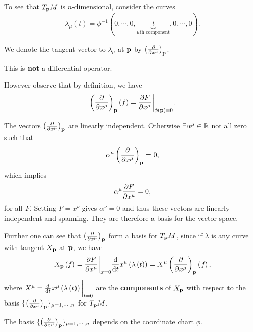 To see that $T_{\vb{p}}M$ is $n$-dimensional, consider the curves
\begin{align}
    \lambda_{\mu} \left( t \right) = \phi ^{-1} \left( 0, \cdots, 0, \underbrace{t}_{\mu\text{th component}},0,\cdots, 0 \right) 
.\end{align}

We denote the tangent vector to $\lambda_\mu$ at $\vb{p}$ by $\left( \pdv{x^{\mu}} \right)_{\vb{p}} $. 

\begin{note}
    This is \textbf{not} a differential operator.
\end{note}

However observe that by definition, we have
\begin{align}
    \left( \pdv{x^{\mu}} \right)_{\vb{p}}\left( f \right) = \pdv{F}{x^{\mu}} \bigg|_{\phi \left( \vb{p} \right) = 0}
.\end{align}

The vectors $\left( \pdv{x^{\mu}} \right)_{\vb{p}}$ are linearly independent. Otherwise $\exists  \alpha^{\mu} \in \mathbb{R}$ not all zero such that
\begin{align}
    \alpha^{\mu} \left( \pdv{x^{\mu}} \right)_{\vb{p}}  = 0
,\end{align}
which implies
\begin{align}
    \alpha^{\mu} \pdv{F}{x^{\mu}} = 0
,\end{align}
for all $F$. Setting $F = x^{\nu}$ gives $\alpha^{\nu} = 0$ and thus these vectors are linearly independent and spanning. They are therefore a basis for the vector space.

Further one can see that $\left( \pdv{x^{\mu}} \right)_{\vb{p}} $ form a basis for $T_{\vb{p}}M$, since if $\lambda$ is any curve with tangent $X_{\vb{p}}$ at $\vb{p}$, we have
\begin{align}
    X_{\vb{p}} \left( f \right) = \pdv{F}{x^{\mu}} \bigg|_{x=0} \dv{t} x^{\mu} \left( \lambda \left( t \right)  \right) = X^{\mu} \left( \pdv{x^{\mu}} \right)_{\vb{p}} \left( f \right) 
,\end{align}
where $X^{\mu} = \dv{t} x^{\mu} \left( \lambda \left( t \right)  \right) \bigg|_{t= 0}$ are the \textbf{components} of $X_{\vb{p}}$ with respect to the basis $\{\left( \pdv{x^{\mu}} \right)_{\vb{p}} \}_{\mu = 1,\cdots,n} $ for $T_{\vb{p}}M$.

\begin{note}
    The basis $\{\left( \pdv{x^{\mu}} \right)_{\vb{p}} \}_{\mu = 1,\cdots,n} $ depends on the coordinate chart $\phi$.
\end{note}

